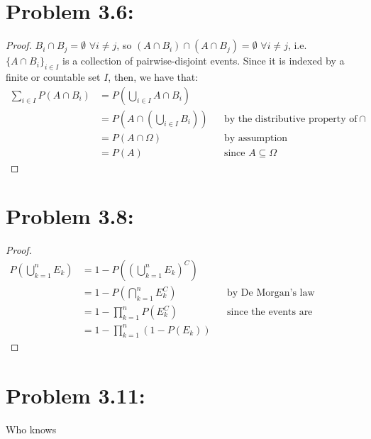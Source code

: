\documentclass{article}
\begin{document}
\section{Problem 3.6:}

\begin{proof}
$B_i \cap B_j = \emptyset$ $\forall i \ne j$, so $(A \cap B_i) \cap (A \cap B_j) = \emptyset$ $\forall i \ne j$, i.e. $\{A \cap B_i\}_{i \in I}$ is a collection of pairwise-disjoint events. Since it is indexed by a finite or countable set $I$, then, we have that:
\begin{align*}
\sum\limits_{i \in I} P(A \cap B_i) &= P(\bigcup\limits_{i \in I} A \cap B_i) \\
&= P(A \cap (\bigcup\limits_{i \in I} B_i)) &&\text{by the distributive property of $\cap$} \\
&= P(A \cap \Omega) &&\text{by assumption} \\
&= P(A) &&\text{since $A \subseteq \Omega$}
\end{align*}
\end{proof}

\section{Problem 3.8:}

\begin{proof}
\begin{align*}
P(\bigcup\limits_{k = 1}^n E_k) &= 1 - P((\bigcup\limits_{k = 1}^n E_k)^C) \\
&= 1 - P(\bigcap\limits_{k = 1}^n E_k^C) &&\text{by De Morgan's law} \\
&= 1 - \prod\limits_{k = 1}^n P(E_k^C) &&\text{since the events are independent} \\
&= 1 - \prod\limits_{k = 1}^n (1 - P(E_k))
\end{align*}
\end{proof}

\section{Problem 3.11:}
Who knows
\end{document}
